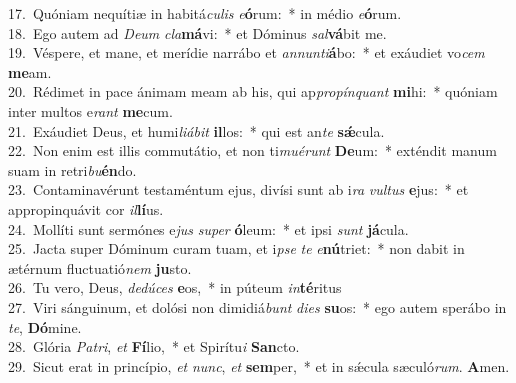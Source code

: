 {17.~}Quóniam nequítiæ in habitá\textit{cu}\textit{lis} \textit{e}\textbf{ó}rum:~* in médio \textit{e}\textbf{ó}rum.\\
{18.~}Ego autem ad \textit{De}\textit{um} \textit{cla}\textbf{má}vi:~* et Dóminus \textit{sal}\textbf{vá}bit me.\\
{19.~}Véspere, et mane, et merídie narrábo et \textit{an}\textit{nun}\textit{ti}\textbf{á}bo:~* et exáudiet vo\textit{cem} \textbf{me}am.\\
{20.~}Rédimet in pace ánimam meam ab his, qui ap\textit{pro}\textit{pín}\textit{quant} \textbf{mi}hi:~* quóniam inter multos e\textit{rant} \textbf{me}cum.\\
{21.~}Exáudiet Deus, et humi\textit{li}\textit{á}\textit{bit} \textbf{il}los:~* qui est an\textit{te} \textbf{sǽ}cula.\\
{22.~}Non enim est illis commutátio, et non ti\textit{mu}\textit{é}\textit{runt} \textbf{De}um:~* exténdit manum suam in retri\textit{bu}\textbf{én}do.\\
{23.~}Contaminavérunt testaméntum ejus, divísi sunt ab i\textit{ra} \textit{vul}\textit{tus} \textbf{e}jus:~* et appropinquávit cor \textit{il}\textbf{lí}us.\\
{24.~}Mollíti sunt sermónes e\textit{jus} \textit{su}\textit{per} \textbf{ó}leum:~* et ipsi \textit{sunt} \textbf{já}cula.\\
{25.~}Jacta super Dóminum curam tuam, et i\textit{pse} \textit{te} \textit{e}\textbf{nú}triet:~* non dabit in ætérnum fluctuatió\textit{nem} \textbf{ju}sto.\\
{26.~}Tu vero, Deus, \textit{de}\textit{dú}\textit{ces} \textbf{e}os,~* in púteum \textit{in}\textbf{té}ritus\\
{27.~}Viri sánguinum, et dolósi non dimidiá\textit{bunt} \textit{di}\textit{es} \textbf{su}os:~* ego autem sperábo in \textit{te}, \textbf{Dó}mine.\\
{28.~}Glória \textit{Pa}\textit{tri}, \textit{et} \textbf{Fí}lio,~* et Spirítu\textit{i} \textbf{San}cto.\\
{29.~}Sicut erat in princípio, \textit{et} \textit{nunc}, \textit{et} \textbf{sem}per,~* et in sǽcula sæculó\textit{rum}. \textbf{A}men.\\
